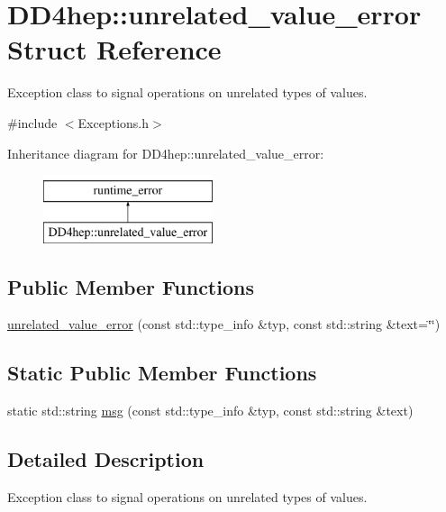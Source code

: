 \hypertarget{struct_d_d4hep_1_1unrelated__value__error}{}\section{D\+D4hep\+:\+:unrelated\+\_\+value\+\_\+error Struct Reference}
\label{struct_d_d4hep_1_1unrelated__value__error}


Exception class to signal operations on unrelated types of values.  




{\ttfamily \#include $<$Exceptions.\+h$>$}

Inheritance diagram for D\+D4hep\+:\+:unrelated\+\_\+value\+\_\+error\+:\begin{figure}[H]
\begin{center}
\leavevmode
\includegraphics[height=2.000000cm]{struct_d_d4hep_1_1unrelated__value__error}
\end{center}
\end{figure}
\subsection*{Public Member Functions}
\begin{DoxyCompactItemize}
\item 
\hyperlink{struct_d_d4hep_1_1unrelated__value__error_adb6fa7ac7ea37b8575dd0550a197555b}{unrelated\+\_\+value\+\_\+error} (const std\+::type\+\_\+info \&typ, const std\+::string \&text=\char`\"{}\char`\"{})
\end{DoxyCompactItemize}
\subsection*{Static Public Member Functions}
\begin{DoxyCompactItemize}
\item 
static std\+::string \hyperlink{struct_d_d4hep_1_1unrelated__value__error_af06e3da0ede17bf6c0c49dd82d615deb}{msg} (const std\+::type\+\_\+info \&typ, const std\+::string \&text)
\end{DoxyCompactItemize}


\subsection{Detailed Description}
Exception class to signal operations on unrelated types of values. 

